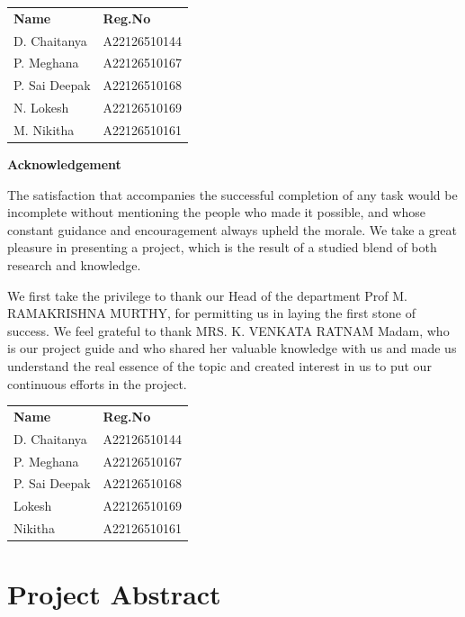 \documentclass[12pt,a4paper]{report}
\begin{document}
\vspace{2cm}
\begin{tabular}{ll}
\textbf{Name} & \textbf{Reg.No} \\
D. Chaitanya & A22126510144 \\
P. Meghana & A22126510167 \\
P. Sai Deepak & A22126510168 \\
N. Lokesh & A22126510169 \\
M. Nikitha & A22126510161 \\
\end{tabular}
\newpage

\thispagestyle{empty}
\begin{center}
    \Large\textbf{Acknowledgement}
\end{center}
\vspace{1cm}

The satisfaction that accompanies the successful completion of any task would
be incomplete without mentioning the people who made it possible, and whose
constant guidance and encouragement always upheld the morale. We take a great
pleasure in presenting a project, which is the result of a studied blend of
both research and knowledge.

We first take the privilege to thank our Head of the department Prof M.
RAMAKRISHNA MURTHY, for permitting us in laying the first stone of success. We
feel grateful to thank MRS. K. VENKATA RATNAM Madam, who is our project guide
and who shared her valuable knowledge with us and made us understand the real
essence of the topic and created interest in us to put our continuous efforts
in the project.

\vspace{2cm}
\begin{tabular}{ll}
\textbf{Name} & \textbf{Reg.No} \\
D. Chaitanya & A22126510144 \\
P. Meghana & A22126510167 \\
P. Sai Deepak & A22126510168 \\
Lokesh & A22126510169 \\
Nikitha & A22126510161 \\
\end{tabular}
\newpage

\tableofcontents
\newpage

\chapter{Project Abstract}
\end{document}

